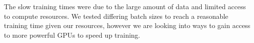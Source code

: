 \documentclass{article} %
\begin{document}
The slow training times were due to the large amount of data and limited access to compute resources. We tested differing batch sizes to reach a reasonable training time given our resources, however we are looking into ways to gain access to more powerful GPUs to speed up training.

\label{last_page}



\end{document}
